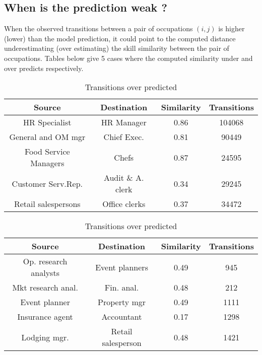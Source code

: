 \documentclass{article}
\begin{document}
\subsection{When is the prediction weak ?} 

When the observed transitions between a pair of occupations $(i,j)$ is higher (lower) than the model prediction, it could point to the computed distance underestimating (over estimating) the skill similarity between the pair of occupations. Tables below give 5 cases where the computed similarity under and over predicts respectively. 

\begin{table}[htbp]
  \begin{minipage}[t]{0.5\textwidth}
    \centering
    \begin{tabular}{|c|c|c|c|}
      \hline
      \textbf{Source } & \textbf{Destination} & \textbf{Similarity} & \textbf{Transitions} \\
      \hline
      HR Specialist & HR Manager & 0.86 & 104068 \\
      General and OM mgr & Chief Exec. & 0.81 & 90449 \\
      Food Service Managers & Chefs & 0.87 & 24595 \\
      Customer Serv.Rep. & Audit \& A. clerk & 0.34 & 29245 \\
      Retail salespersons & Office clerks & 0.37 & 34472 \\
      \hline
    \end{tabular}
    \caption{Transitions under predicted }
    \label{table: }
  \end{minipage}

  \vspace{1cm} %

  \begin{minipage}[t]{0.5\textwidth}
    \centering
    \begin{tabular}{|c|c|c|c|}
      \hline
      \textbf{Source } & \textbf{Destination} & \textbf{Similarity} & \textbf{Transitions}  \\
      \hline
      Op. research analysts & Event planners & 0.49 & 945 \\
     Mkt research anal. & Fin. anal. & 0.48 & 212 \\
     Event planner & Property mgr& 0.49 & 1111 \\
     Insurance agent & Accountant  & 0.17 & 1298 \\
     Lodging mgr. & Retail salesperson & 0.48 & 1421 \\
      \hline
    \end{tabular}
    \caption{Transitions over predicted}
    \label{table:table2}
  \end{minipage}
\end{table}
\end{document}
